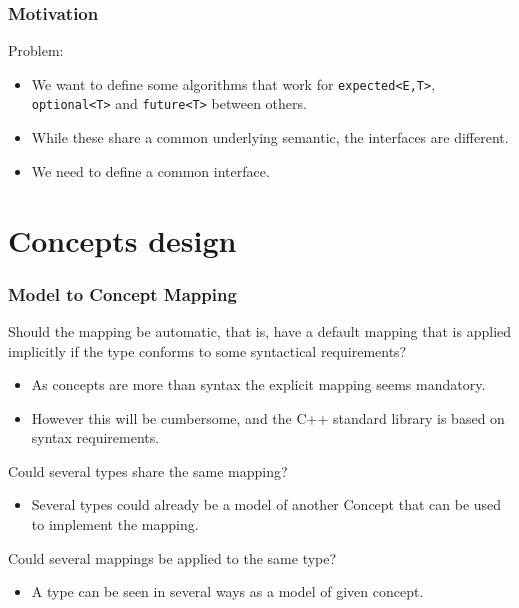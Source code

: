 \documentclass[xcolor=dvipsnames]{beamer}
\newcommand{\cpp}[1]{\lstinline{#1}}
\begin{document}
\begin{frame}[fragile]
\frametitle{Motivation}

Problem:

\begin{itemize}
  \item We want to define some algorithms that work for \cpp{expected<E,T>}, \cpp{optional<T>} and \cpp{future<T>} between others.
  \item While these share a common underlying semantic, the interfaces are different.
  \item We need to define a common interface. 
\end{itemize}

\end{frame}
\section{Concepts design}
\begin{frame}[fragile]
\frametitle{Model to Concept Mapping}

Should the mapping be automatic, that is, have a default mapping that is applied implicitly if the type conforms to some syntactical requirements? 

\begin{itemize}
  \item As concepts are more than syntax the explicit mapping seems mandatory. 
  \item However this will be cumbersome, and the C++ standard library is based on syntax requirements.
\end{itemize}

Could several types share the same mapping?

\begin{itemize}
  \item Several types could already be a model of another Concept that can be used to implement the mapping. 
\end{itemize}

Could several mappings be applied to the same type?

\begin{itemize}
  \item A type can be seen in several ways as a model of given concept. 
\end{itemize}


\end{frame}
\end{document}
